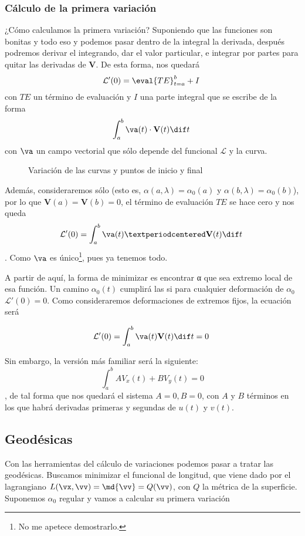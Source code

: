 \documentclass[oneside, nochap]{apuntes}
\newcommand{\lfi}{\ensuremath{\mathcal{L}}}
\newcommand{\vV}{\mathbf{V}}
\renewcommand{\(}{\begin{equation}}
\renewcommand{\)}{\end{equation}}
\begin{document}
\subsubsection{Cálculo de la primera variación}

¿Cómo calculamos la primera variación? Suponiendo que las funciones son bonitas y todo eso y podemos pasar dentro de la integral la derivada, después podremos derivar el integrando, dar el valor particular, e integrar por partes para quitar las derivadas de $\vV$. De esta forma, nos quedará \[ \lfi'(0) = \eval{TE}_{t=a}^{b} + I \] con $TE$ un término de evaluación y $I$ una parte integral que se escribe de la forma \[ \int_a^b \va(t) \cdot \vV(t) \dif t \] con $\va$ un campo vectorial que sólo depende del funcional $\lfi$ y la curva.

\begin{figure}[hbtp]
\caption{Variación de las curvas y puntos de inicio y final}
\end{figure}

Además, consideraremos sólo  (esto es, $α(a,λ) = α_0(a)$ y $α(b,λ) = α_0(b)$), por lo que $\vV(a) = \vV(b) = 0$, el término de evaluación $TE$ se hace cero y nos queda \[ \lfi'(0) = \int_a^b \va(t) · \vV(t) \dif t \]. Como $\va$ es único\footnote{No me apetece demostrarlo.}, pues ya tenemos todo.

A partir de aquí, la forma de minimizar es encontrar α que sea extremo local de esa función. Un camino $α_0(t)$ cumplirá las  si para cualquier deformación de $α_0$ $\lfi'(0)=0$. Como consideraremos deformaciones de extremos fijos, la ecuación será

\[ \lfi'(0) = \int_a^b \va(t) \vV(t) \dif t = 0 \]

Sin embargo, la versión más familiar será la siguiente: \[ \int_a^b A V_x (t) + B V_y(t) = 0 \], de tal forma que nos quedará el sistema $A=0, B=0$, con $A$ y $B$ términos en los que habrá derivadas primeras y segundas de $u(t)$ y $v(t)$.

\subsection{Geodésicas}

Con las herramientas del cálculo de variaciones podemos pasar a tratar las geodésicas. Buscamos minimizar el funcional de longitud, que viene dado por el lagrangiano $L(\vx, \vv) = \md{\vv} = Q(\vv)$, con $Q$ la métrica de la superficie. Suponemos $α_0$ regular y vamos a calcular su primera variación
\end{document}
